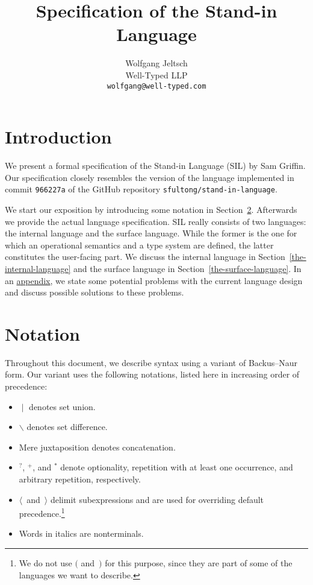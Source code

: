\documentclass{scrartcl}
\title{Specification of the Stand-in Language}
\author{%
    Wolfgang Jeltsch\\
    \small Well-Typed LLP\\
    \small\texttt{wolfgang@well-typed.com}%
}
\newcommand{\optional}{^{?}}
\newcommand{\some}{^{+}}
\newcommand{\many}{^{*}}
\begin{document}
\maketitle

\section{Introduction}

We present a formal specification of the Stand-in Language (SIL) by Sam
Griffin. Our specification closely resembles the version of the language
implemented in commit \texttt{966227a} of the GitHub repository
\texttt{sfultong/stand-in-language}.

We start our exposition by introducing some notation in
Section~\ref{notation}. Afterwards we provide the actual language
specification. SIL really consists of two languages: the internal
language and the surface language. While the former is the one for which
an operational semantics and a type system are defined, the latter
constitutes the user-facing part. We discuss the internal language in
Section~\ref{the-internal-language} and the surface language in
Section~\ref{the-surface-language}. In an
\hyperref[potential-problems]{appendix}, we state some potential
problems with the current language design and discuss possible solutions
to these problems.

\section{Notation}
\label{notation}

Throughout this document, we describe syntax using a variant of
Backus–Naur form. Our variant uses the following notations, listed here
in increasing order of precedence:
\begin{itemize}

\item

$∣$ denotes set union.

\item

$∖$ denotes set difference.

\item

Mere juxtaposition denotes concatenation.

\item

$\optional$, $\some$, and $\many$ denote optionality, repetition with at
least one occurrence, and arbitrary repetition, respectively.

\item

$⟨$~and~$⟩$ delimit subexpressions and are used for overriding default
precedence.\footnote{We do not use $($ and~$)$ for this purpose, since
they are part of some of the languages we want to describe.}

\item

Words in italics are nonterminals.

\end{itemize}
\end{document}
